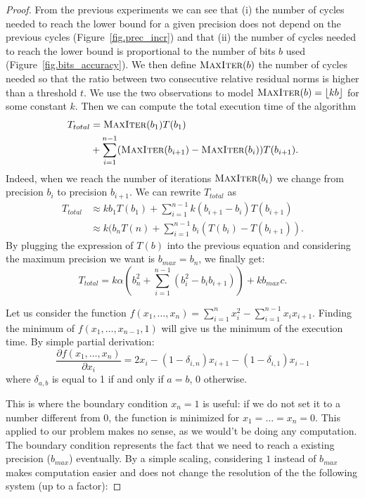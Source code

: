    \begin{proof}
   From the previous experiments we can see that (i) the number of cycles needed to reach the lower bound for a given precision does not depend on the previous cycles (Figure~\ref{fig.prec_incr}) and that (ii) the number of cycles
   needed to reach the lower bound is proportional to the number of bits $b$ used (Figure~\ref{fig.bits_accuracy}). We then define $\textsc{MaxIter}(b)$ the number of cycles needed so that the ratio between two consecutive
   relative residual norms is higher than a threshold $t$. We use the two observations to model $\textsc{MaxIter}(b) = \lfloor kb \rfloor$ for some constant $k$.
   Then we can compute the total execution time of the algorithm
   \begin{align*}
   T_{total}& = \textsc{MaxIter}(b_1)T(b_1)\\
   & +  \sum\limits_{i=1}^{n-1} (\textsc{MaxIter}(b_{i+1})-\textsc{MaxIter}(b_i))T(b_{i+1}).
   \end{align*}
   Indeed, when we reach the number of iterations $\textsc{MaxIter}(b_i)$ we change from precision $b_i$ to precision $b_{i+1}$.
   We can rewrite $T_{total}$ as
   \begin{align*}
    T_{total} &\approx k b_{1} T(b_1) + \sum\limits_{i=1}^{n-1} k(b_{i+1}-b_{i})T(b_{i+1})\\
	    & \approx k ( b_{n}T(n) + \sum\limits_{i=1}^{n-1} b_i ( T(b_i) - T(b_{i+1})).
   \end{align*}
   By plugging the expression of $T(b)$ into the previous equation and considering the maximum precision we want is $b_{max}=b_n$, we finally get:
   \begin{equation}
    T_{total}  = k\alpha\left(b_n^2 + \sum\limits_{i=1}^{n-1} (b_i^2 - b_i b_{i+1})\right) + kb_{max}c.
   \end{equation}
   
   Let us consider the function $f(x_1,\dots,x_n) = \sum\limits_{i=1}^n x_i^2 - \sum\limits_{i=1}^{n-1} x_ix_{i+1}$. Finding the minimum of $f(x_1,\dots,x_{n-1},1)$ will give
   us the minimum of the execution time.
   By simple partial derivation:
   \[ \frac{\partial f(x_1,\dots,x_n)}{\partial x_i} = 2x_i - (1-\delta_{i,n})x_{i+1} - (1-\delta_{i,1})x_{i-1} \]
   where $\delta_{a,b} $ is equal to 1 if and only if $a=b$, 0 otherwise.
   
   This is where the boundary condition $x_n = 1$ is useful: if we do not set it to a number different from 0, the function is minimized for $x_1=\dots=x_n=0$. This applied to our problem
   makes no sense, as we would't be doing any computation. The boundary condition represents the fact that we need to reach a existing precision ($b_{max}$) eventually. By a simple scaling,
   considering $1$ instead of $b_{max}$ makes computation easier and does not change the resolution of the the following system (up to a factor):
   

\end{proof}
